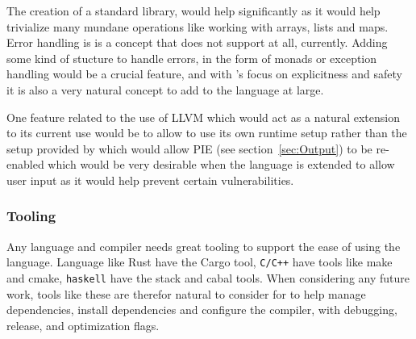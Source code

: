 The creation of a standard library, would help \lang{} significantly as it would help
trivialize many mundane operations like working with arrays, lists and maps. \\

Error handling is is a concept that \lang{} does not support at all, currently.
Adding some kind of stucture to handle errors, in the form of monads or exception
handling would be a crucial feature, and with \lang's focus on explicitness and
safety it is also a very natural concept to add to the language at large.

One feature related to the use of LLVM which would act as a natural extension to its
current use would be to allow \lang{} to use its own runtime setup rather than the
setup provided by \gcc{} which would allow PIE (see section~\ref{sec:Output}) to be
re-enabled which would be very desirable when the language is extended to allow user
input as it would help prevent certain vulnerabilities.

\subsubsection{Tooling} \label{sec:tooling}

Any language and compiler needs great tooling to support the ease of using the
language. Language like Rust have the Cargo tool, \texttt{C/C++} have tools like make
and cmake, \texttt{haskell} have the stack and cabal tools. When considering any
future work, tools like these are therefor natural to consider for \lang{} to help
manage dependencies, install dependencies and configure the compiler, with debugging,
release, and optimization flags. 

